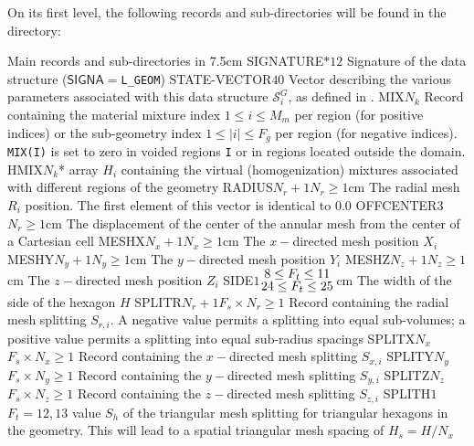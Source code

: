 On its first level, the
following records and sub-directories will be found in the  directory:

\begin{DescriptionEnregistrement}{Main records and sub-directories in }{7.5cm}
\CharEnr
  {SIGNATURE}{$*12$}
  {Signature of the data structure ($\mathsf{SIGNA}=${\tt L\_GEOM})}
\IntEnr
  {STATE-VECTOR}{$40$}
  {Vector describing the various parameters associated with this data structure $\mathcal{S}^{G}_{i}$,
  as defined in .}
\IntEnr
  {MIX}{$N_{k}$}
  {Record containing the material mixture index $1\le i \le M_m$ per region (for positive indices) or
  the sub-geometry index $1\le |i| \le F_g$ per region (for negative indices). {\tt MIX(I)} is set to
  zero in voided regions {\tt I} or in regions located outside the domain.}
\OptIntEnr
  {HMIX}{$N_{k}$}{*}
  {array $H_{i}$ containing the virtual (homogenization) mixtures associated with different regions of the geometry}
\OptRealEnr
  {RADIUS}{$N_{r}+1$}{$N_{r}\ge 1$}{cm}
  {The radial mesh $R_{i}$ position. The first element of this vector is identical to 0.0}
\OptRealEnr
  {OFFCENTER}{$3$}{$N_{r}\ge 1$}{cm}
  {The displacement of the center of the annular mesh from the center of a Cartesian cell}
\OptRealEnr
  {MESHX}{$N_{x}+1$}{$N_{x}\ge 1$}{cm}
  {The $x-$directed mesh position $X_{i}$}
\OptRealEnr
  {MESHY}{$N_{y}+1$}{$N_{y}\ge 1$}{cm}
  {The $y-$directed mesh position $Y_{i}$}
\OptRealEnr
  {MESHZ}{$N_{z}+1$}{$N_{z}\ge 1$}{cm}
  {The $z-$directed mesh position $Z_{i}$}
\OptRealEnr
  {SIDE}{$1$}{${{\displaystyle 8\le F_{t}\le 11} \atop \displaystyle {24\le F_{t}\le 25}}$}{cm}
  {The width of the side of the hexagon $H$}
\OptIntEnr
  {SPLITR}{$N_{r}+1$}{$F_{s}\times N_{r}\ge 1$}
  {Record containing the radial mesh splitting $S_{r,i}$. A negative value permits a splitting into
  equal sub-volumes; a positive value permits a splitting into equal sub-radius spacings}
\OptIntEnr
  {SPLITX}{$N_{x}$}{$F_{s}\times N_{x}\ge 1$}
  {Record containing the $x-$directed mesh splitting $S_{x,i}$}
\OptIntEnr
  {SPLITY}{$N_{y}$}{$F_{s}\times N_{y}\ge 1$}
  {Record containing the $y-$directed mesh splitting $S_{y,i}$}
\OptIntEnr
  {SPLITZ}{$N_{z}$}{$F_{s}\times N_{z}\ge 1$}
  {Record containing the $z-$directed mesh splitting $S_{z,i}$}
\OptIntEnr
  {SPLITH}{$1$}{$F_{t}=12,13$}
  {value $S_{h}$ of the triangular mesh splitting for triangular hexagons in the geometry. This will lead to a spatial triangular mesh spacing of $H_{s}=H/N_{x}$}

\end{DescriptionEnregistrement}

